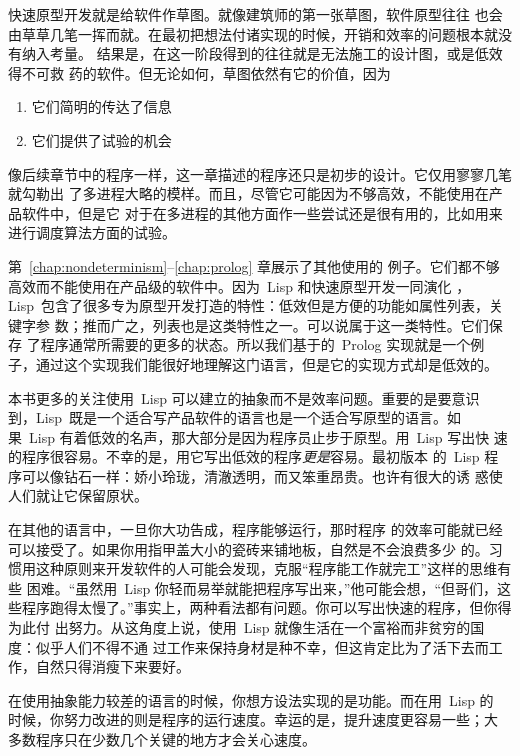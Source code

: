 快速原型开发就是给软件作草图。就像建筑师的第一张草图，软件原型往往
也会由草草几笔一挥而就。在最初把想法付诸实现的时候，开销和效率的问题根本就没有纳入考量。
结果是，在这一阶段得到的往往就是无法施工的设计图，或是低效得不可救
药的软件。但无论如何，草图依然有它的价值，因为
\begin{enumerate}
    \item 它们简明的传达了信息
    \item 它们提供了试验的机会
\end{enumerate}
像后续章节中的程序一样，这一章描述的程序还只是初步的设计。它仅用寥寥几笔就勾勒出
了多进程大略的模样。而且，尽管它可能因为不够高效，不能使用在产品软件中，但是它
对于在多进程的其他方面作一些尝试还是很有用的，比如用来进行调度算法方面的试验。

第~\ref{chap:nondeterminism}--\ref{chap:prolog} 章展示了其他使用\continuation{}的
例子。它们都不够高效而不能使用在产品级的软件中。因为~Lisp 和快速原型开发一同演化
，Lisp~包含了很多专为原型开发打造的特性：低效但是方便的功能如属性列表，关键字参
数；推而广之，列表也是这类特性之一。\continuation{}可以说属于这一类特性。它们保存
了程序通常所需要的更多的状态。所以我们基于\continuation{}的~Prolog 实现就是一个例
子，通过这个实现我们能很好地理解这门语言，但是它的实现方式却是低效的。

本书更多的关注使用~Lisp 可以建立的抽象而不是效率问题。重要的是要意识
到，Lisp~既是一个适合写产品软件的语言也是一个适合写原型的语言。如
果~Lisp 有着低效的名声，那大部分是因为程序员止步于原型。用~Lisp 写出快
速的程序很容易。不幸的是，用它写出低效的程序\emph{更是}容易。最初版本
的~Lisp 程序可以像钻石一样：娇小玲珑，清澈透明，而又笨重昂贵。也许有很大的诱
惑使人们就让它保留原状。

在其他的语言中，一旦你大功告成，程序能够运行，那时程序
的效率可能就已经可以接受了。如果你用指甲盖大小的瓷砖来铺地板，自然是不会浪费多少
的。习惯用这种原则来开发软件的人可能会发现，克服“程序能工作就完工”这样的思维有些
困难。“虽然用~Lisp 你轻而易举就能把程序写出来，”他可能会想，“但哥们，这
些程序跑得太慢了。”事实上，两种看法都有问题。你可以写出快速的程序，但你得为此付
出努力。从这角度上说，使用~Lisp 就像生活在一个富裕而非贫穷的国度：似乎人们不得不通
过工作来保持身材是种不幸，但这肯定比为了活下去而工作，自然只得消瘦下来要好。

在使用抽象能力较差的语言的时候，你想方设法实现的是功能。而在用~Lisp 的
时候，你努力改进的则是程序的运行速度。幸运的是，提升速度更容易一些；大
多数程序只在少数几个关键的地方才会关心速度。


